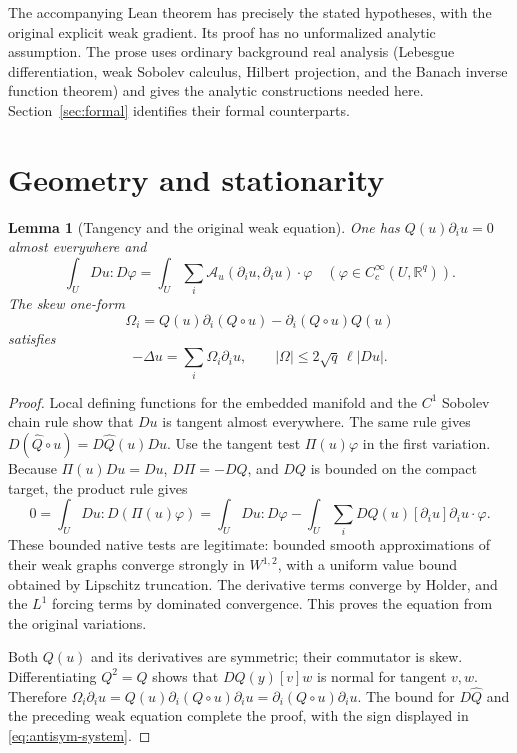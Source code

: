 \documentclass[reqno,11pt]{amsart}
\numberwithin{equation}{section}
\newtheorem{lemma}[theorem]{Lemma}
\theoremstyle{definition}
\theoremstyle{remark}
\newcommand{\R}{\mathbb R}
\begin{document}
The accompanying Lean theorem has precisely the stated hypotheses, with
the original explicit weak gradient. Its proof has no unformalized
analytic assumption. The prose uses ordinary background real analysis
(Lebesgue differentiation, weak Sobolev calculus, Hilbert projection, and
the Banach inverse function theorem) and gives the analytic constructions
needed here. Section~\ref{sec:formal} identifies their formal counterparts.

\section{Geometry and stationarity}\label{sec:geometry}
\begin{lemma}[Tangency and the original weak equation]\label{lem:geometry}
One has $Q(u)\partial_i u=0$ almost everywhere and
\begin{equation}\label{eq:harmonic-equation}
 \int_U Du:D\varphi
 =\int_U\sum_i\mathcal A_u(\partial_i u,\partial_i u)\cdot\varphi
 \quad(\varphi\in C_c^\infty(U,\R^q)).
\end{equation}
The skew one-form
\begin{equation}\label{eq:omega}
 \Omega_i=Q(u)\partial_i(Q\circ u)-\partial_i(Q\circ u)Q(u)
\end{equation}
satisfies
\begin{equation}\label{eq:antisym-system}
 -\Delta u=\sum_i\Omega_i\partial_i u,
 \qquad |\Omega|\leq2\sqrt q\,\ell|Du|.
\end{equation}
\end{lemma}
\begin{proof}
Local defining functions for the embedded manifold and the $C^1$ Sobolev
chain rule show that $Du$ is tangent almost everywhere. The same rule gives
$D(\widehat Q\circ u)=D\widehat Q(u)Du$. Use the tangent test
$\Pi(u)\varphi$ in the first variation. Because $\Pi(u)Du=Du$,
$D\Pi=-DQ$, and $DQ$ is bounded on the compact target, the product rule
gives
\[
 0=\int_U Du:D(\Pi(u)\varphi)
  =\int_U Du:D\varphi
     -\int_U\sum_i DQ(u)[\partial_i u]\partial_i u\cdot\varphi.
\]
These bounded native tests are legitimate: bounded smooth approximations
of their weak graphs converge strongly in $W^{1,2}$, with a uniform value
bound obtained by Lipschitz truncation. The derivative terms converge by
Holder, and the $L^1$ forcing terms by dominated convergence. This proves
the equation from the original variations.

Both $Q(u)$ and its derivatives are symmetric; their commutator is skew.
Differentiating $Q^2=Q$ shows that $DQ(y)[v]w$ is normal for tangent
$v,w$. Therefore
$\Omega_i\partial_i u=Q(u)\partial_i(Q\circ u)\partial_i u
=\partial_i(Q\circ u)\partial_i u$.
The bound for $D\widehat Q$ and the preceding weak equation complete
the proof, with the sign displayed in \eqref{eq:antisym-system}.
\end{proof}
\end{document}
